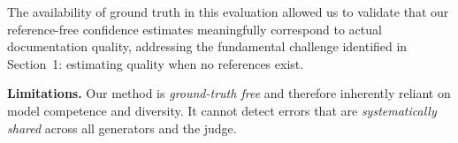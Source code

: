 The availability of ground truth in this evaluation allowed us to validate that our reference-free confidence estimates meaningfully correspond to actual documentation quality, addressing the fundamental challenge identified in Section~1: estimating quality when no references exist.

\noindent
\textbf{Limitations.}
Our method is \emph{ground-truth free} and therefore inherently reliant
on model competence and diversity. It cannot detect errors that are
\emph{systematically shared} across all generators and the judge. 